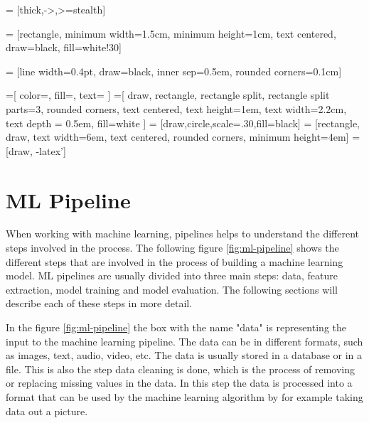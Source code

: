 \usetikzlibrary{shapes,arrows,chains}
\usetikzlibrary[calc]
\usetikzlibrary{shapes.geometric, arrows, fit, calc, automata, positioning, shapes.multipart}
\usepackage{comment}
\renewenvironment{comment}{}{}
     = [thick,->,>=stealth]

     = [rectangle, minimum width=1.5cm, minimum height=1cm, text centered, draw=black, fill=white!30]

     = [line width=0.4pt, draw=black, inner sep=0.5em, rounded corners=0.1cm]

    \usetikzlibrary{shapes.geometric, arrows, fit, calc, automata, positioning}
=[
    color=\umldrawcolor,
    fill=\umlfillcolor,
    text=\umltextcolor
]
=[
    draw,
    rectangle,
    rectangle split,
    rectangle split parts=3,
    rounded corners,
    text centered,
    text height=1em,
    text width=2.2cm,
    text depth = 0.5em,
    fill=white
]
 = [draw,circle,scale=.30,fill=black]
 = [rectangle, draw, text width=6em, text centered, rounded corners, minimum height=4em]
 = [draw, -latex']

\section{ML Pipeline}
When working with machine learning, pipelines helps to understand the different steps involved in the process. The following figure \ref{fig:ml-pipeline} shows the different steps that are involved in the process of building a machine learning model.
ML pipelines are usually divided into three main steps: data, feature extraction, model training and model evaluation. The following sections will describe each of these steps in more detail. 

In the figure \ref{fig:ml-pipeline} the box with the name "data" is representing the input to the machine learning pipeline. The data can be in different formats, such as images, text, audio, video, etc. The data is usually stored in a database or in a file. This is also the step data cleaning is done, which is the process of removing or replacing missing values in the data. In this step the data is processed into a format that can be used by the machine learning algorithm by for example taking data out a picture. 

